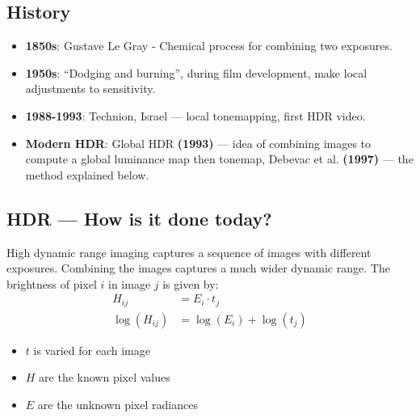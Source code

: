 \documentclass{article}
\begin{document}
\subsection{History}
\begin{itemize}
	\item {\bf 1850s}: Gustave Le Gray - Chemical process for combining two exposures.
	\item {\bf 1950s}: ``Dodging and burning'', during film development, make local adjustments to sensitivity.
	\item {\bf 1988-1993}: Technion, Israel --- local tonemapping, first HDR video.
	\item {\bf Modern HDR}: Global HDR {\bf (1993)} --- idea of combining images to compute a global luminance map then tonemap, Debevac et al. {\bf (1997)} --- the method explained below. 
\end{itemize}

\subsection{HDR --- How is it done today?}
High dynamic range imaging captures a sequence of images with different exposures. 
Combining the images captures a much wider dynamic range.
The brightness of pixel $i$ in image $j$ is given by:
\begin{align*}
	H_{ij} &= E_i \cdot t_j \\
	\log(H_{ij}) &= \log(E_i) + \log(t_j)
\end{align*}
\begin{itemize}
	\item $t$ is varied for each image
	\item $H$ are the known pixel values
	\item $E$ are the unknown pixel radiances
\end{itemize}
\end{document}
